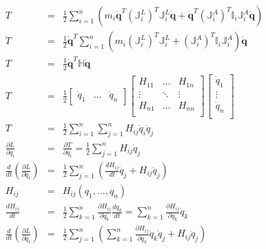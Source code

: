 \documentclass[a4paper]{article}
\begin{document}
\begin{eqnarray*}
T & = & \frac{1}{2} \sum_{i=1}^{n} (m_i \dot{\textbf{q}}^T (\mathbb{J}_i^L)^T \mathbb{J}_i^L \dot{\textbf{q}} + \dot{\textbf{q}}^T (\mathbb{J}_i^A)^T \mathbb{I}_i \mathbb{J}_i^A \dot{\textbf{q}})\\
T & = & \frac{1}{2} \dot{\textbf{q}}^T \sum_{i=1}^{n} (m_i  (\mathbb{J}_i^L)^T \mathbb{J}_i^L  +(\mathbb{J}_i^A)^T \mathbb{I}_i \mathbb{J}_i^A) \dot{\textbf{q}}\\
T & = & \frac{1}{2} \dot{\textbf{q}}^T \mathbb{H} \dot{\textbf{q}}\\
T & = & \frac{1}{2} \begin{bmatrix}
		\dot{q}_1 & \dots & \dot{q}_n
        \end{bmatrix} \begin{bmatrix}
        H_{11} & \dots & H_{1n}\\
        \vdots & \ddots & \vdots\\
		H_{n1} & \dots & H_{nn}\\
        \end{bmatrix} \begin{bmatrix}
        \dot{q}_1\\
        \vdots\\
        \dot{q}_n\\
        \end{bmatrix}\\
T & = & \frac{1}{2} \sum_{i=1}^{n} \sum_{j=1}^{n} H_{ij} \dot{q}_i \dot{q}_j\\
\frac{\partial L}{\partial \dot{q}_i} & = & \frac{\partial T}{\partial \dot{q}_i} = \frac{1}{2} \sum_{j=1}^{n} H_{ij} \dot{q}_j\\
\frac{d}{dt} ( \frac{\partial L}{\partial \dot{q}_i} ) & = & \frac{1}{2} \sum_{j=1}^{n} ( \frac{dH_{ij}}{dt} \dot{q}_j + H_{ij} \ddot{q}_j)\\
H_{ij} & = & H_{ij}(q_1,\dots,q_n)\\
\frac{dH_{ij}}{dt} & = & \frac{1}{2} \sum_{k=1}^{n} \frac{\partial H_{ij}}{\partial q_k} \frac{dq_k}{dt} = \sum_{k=1}^{n} \frac{\partial H_{ij}}{\partial q_k} \dot{q}_k\\
\frac{d}{dt} ( \frac{\partial L}{\partial \dot{q}_i} ) & = & \frac{1}{2} \sum_{j=1}^{n} ( \sum_{k=1}^{n} \frac{\partial H_{ij}}{\partial q_k} \dot{q}_k \dot{q}_j + H_{ij} \ddot{q}_j)\\
\end{eqnarray*}
\end{document}
